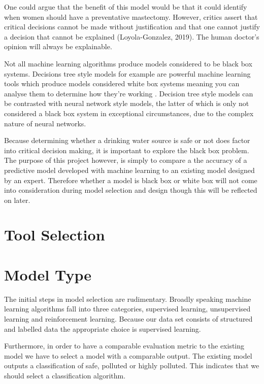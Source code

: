 One could argue that the benefit of this model would be that it could identify when women should have a preventative mastectomy. However, critics assert that critical decisions cannot be made without justification and that one cannot justify a decision that cannot be explained (Loyola-Gonzalez, 2019). The human doctor's opinion will always be explainable.

Not all machine learning algorithms produce models considered to be black box systems. Decisions tree style models for example are powerful machine learning tools which produce models considered white box systems meaning you can analyse them to determine how they're working \parencite{Caruana2006}. Decision tree style models can be contrasted with neural network style models, the latter of which is only not considered a black box system in exceptional circumstances, due to the complex nature of neural networks.

Because determining whether a drinking water source is safe or not does factor into critical decision making, it is important to explore the black box problem. The purpose of this project however, is simply to compare a the accuracy of a predictive model developed with machine learning to an existing model designed by an expert. Therefore whether a model is black box or white box will not come into consideration during model selection and design though this will be reflected on later.

\section{Tool Selection}


\section{Model Type}

The initial steps in model selection are rudimentary. Broadly speaking machine learning algorithms fall into three categories, supervised learning, unsupervised learning and reinforcement learning. Because our data set consists of structured and labelled data the appropriate choice is supervised learning.

Furthermore, in order to have a comparable evaluation metric to the existing model we have to select a model with a comparable output. The existing model outputs a classification of safe, polluted or highly polluted. This indicates that we should select a classification algorithm. 

